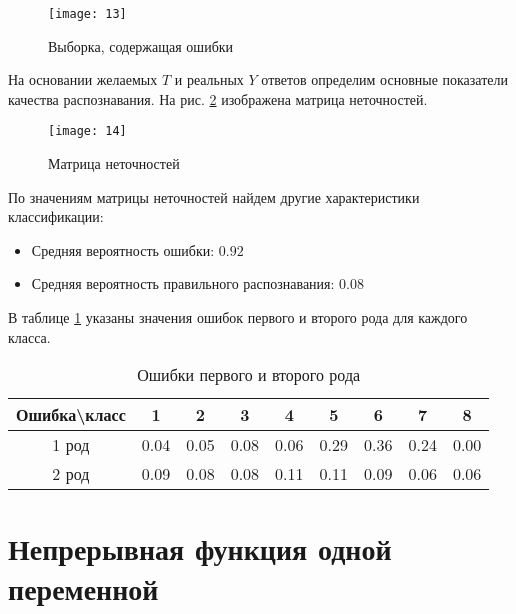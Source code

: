 \begin{figure}[H]
\begin{center}
	\texttt{[image: 13]}
	\caption{Выборка, содержащая ошибки}
	\label{fig:eight_classes_noise}
\end{center}
\end{figure}

На основании желаемых $T$ и реальных $Y$ ответов определим основные показатели качества распознавания. На рис. \ref{fig:eight_classes_conf_matrix} изображена матрица неточностей.

\begin{figure}[H]
\begin{center}
	\texttt{[image: 14]}
	\caption{Матрица неточностей}
	\label{fig:eight_classes_conf_matrix}
\end{center}
\end{figure}

По значениям матрицы неточностей найдем другие характеристики классификации:
\begin{itemize}
	\setlength\itemsep{0em}
	\item Средняя вероятность ошибки: $0.92$
	\item Средняя вероятность правильного распознавания: $0.08$
\end{itemize}

В таблице \ref{tab:eight_classes_errors} указаны значения ошибок первого и второго рода для каждого класса.

\vspace{-0.5cm}
\begin{table}[H]
\begin{center}
	\begin{tabular}{|c|c|c|c|c|c|c|c|c|}
		\hline
		Ошибка\textbackslash класс & 1 & 2 & 3 & 4 & 5 & 6 & 7 & 8 \\ 
		\hline
		1 род & 0.04 & 0.05 & 0.08 & 0.06 & 0.29 & 0.36 & 0.24 & 0.00 \\ 
		\hline
		2 род & 0.09 & 0.08 & 0.08 & 0.11 & 0.11 & 0.09 & 0.06 & 0.06 \\ 
		\hline
	\end{tabular}
	\caption{Ошибки первого и второго рода}
	\label{tab:eight_classes_errors}
\end{center}
\end{table}

\section{Непрерывная функция одной переменной}


